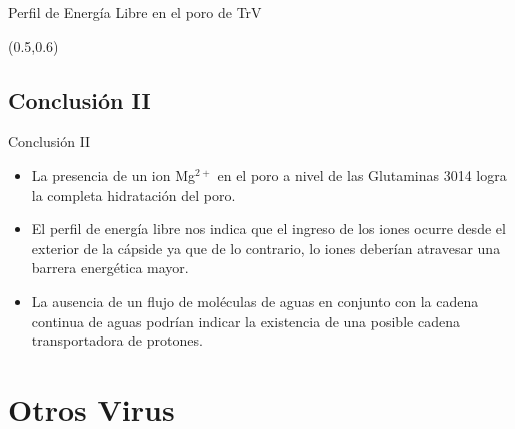 \documentclass[8pt]{beamer}
\begin{document}
\begin{frame}{Perfil de Energía Libre en el poro de TrV}
\begin{textblock*}{6cm}(0.5\textwidth,0.6\textheight)
\end{textblock*}

\end{frame}

\subsection{Conclusión II}
\begin{frame}{Conclusión II}
\begin{itemize}
    \item La presencia de un ion \alert{Mg$^{2+}$} en el poro a nivel de las Glutaminas 3014 logra la \alert{completa hidratación del poro}.\vfill
    \item El perfil de energía libre nos indica que el \alert{ingreso de los iones} ocurre \alert{desde el exterior} de la cápside ya que de lo contrario, lo iones deberían atravesar una barrera energética mayor.\vfill
    \item La ausencia de un flujo de moléculas de aguas en conjunto con la cadena continua de aguas podrían indicar la existencia de una posible \alert{cadena transportadora de protones}.
\end{itemize}
\end{frame}

%
%

\section{Otros Virus}
\end{document}
